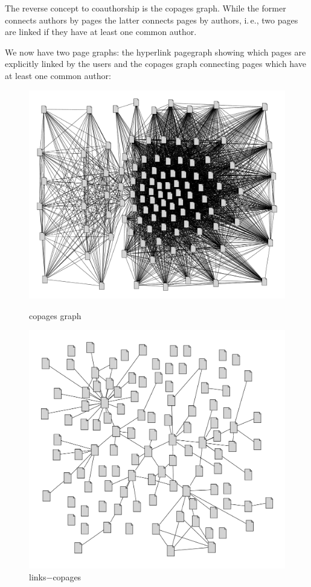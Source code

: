 \documentclass[a4paper]{scrartcl}
\begin{document}
\bigskip

The reverse concept to coauthorship is the copages graph. While the
former connects authors by pages the latter connects pages by authors,
i.\,e., two pages are linked if they have at least one common author. 

We now have two page graphs: the hyperlink pagegraph showing which
pages are explicitly linked by the users and the copages graph
connecting pages which have at least one common author:

\begin{figure}
  \parbox[b]{.6\textwidth}{
  \includegraphics[width=\linewidth]{copages}\vspace{-2ex}
  \caption{copages graph}
  \label{fig:copages}}%
\parbox[b]{.4\textwidth}{
  \includegraphics[width=\linewidth]{pg-copg}\vspace{4ex}
  \caption{links$-$copages}
  \label{fig:copages}}
\end{figure}
\end{document}
